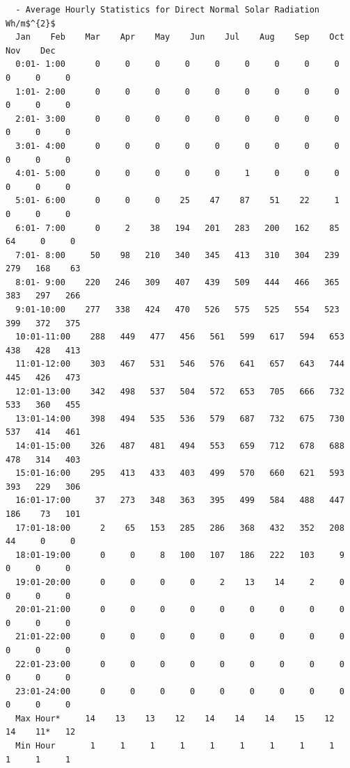 \begin{lstlisting}
  - Average Hourly Statistics for Direct Normal Solar Radiation Wh/m$^{2}$
  Jan    Feb    Mar    Apr    May    Jun    Jul    Aug    Sep    Oct    Nov    Dec   
  0:01- 1:00      0     0     0     0     0     0     0     0     0     0     0     0 
  1:01- 2:00      0     0     0     0     0     0     0     0     0     0     0     0 
  2:01- 3:00      0     0     0     0     0     0     0     0     0     0     0     0 
  3:01- 4:00      0     0     0     0     0     0     0     0     0     0     0     0 
  4:01- 5:00      0     0     0     0     0     1     0     0     0     0     0     0 
  5:01- 6:00      0     0     0    25    47    87    51    22     1     0     0     0 
  6:01- 7:00      0     2    38   194   201   283   200   162    85    64     0     0 
  7:01- 8:00     50    98   210   340   345   413   310   304   239   279   168    63 
  8:01- 9:00    220   246   309   407   439   509   444   466   365   383   297   266 
  9:01-10:00    277   338   424   470   526   575   525   554   523   399   372   375 
  10:01-11:00    288   449   477   456   561   599   617   594   653   438   428   413 
  11:01-12:00    303   467   531   546   576   641   657   643   744   445   426   473 
  12:01-13:00    342   498   537   504   572   653   705   666   732   533   360   455 
  13:01-14:00    398   494   535   536   579   687   732   675   730   537   414   461 
  14:01-15:00    326   487   481   494   553   659   712   678   688   478   314   403 
  15:01-16:00    295   413   433   403   499   570   660   621   593   393   229   306 
  16:01-17:00     37   273   348   363   395   499   584   488   447   186    73   101 
  17:01-18:00      2    65   153   285   286   368   432   352   208    44     0     0 
  18:01-19:00      0     0     8   100   107   186   222   103     9     0     0     0 
  19:01-20:00      0     0     0     0     2    13    14     2     0     0     0     0 
  20:01-21:00      0     0     0     0     0     0     0     0     0     0     0     0 
  21:01-22:00      0     0     0     0     0     0     0     0     0     0     0     0 
  22:01-23:00      0     0     0     0     0     0     0     0     0     0     0     0 
  23:01-24:00      0     0     0     0     0     0     0     0     0     0     0     0 
  Max Hour*     14    13    13    12    14    14    14    15    12    14    11*   12  
  Min Hour       1     1     1     1     1     1     1     1     1     1     1     1  


\end{lstlisting}
